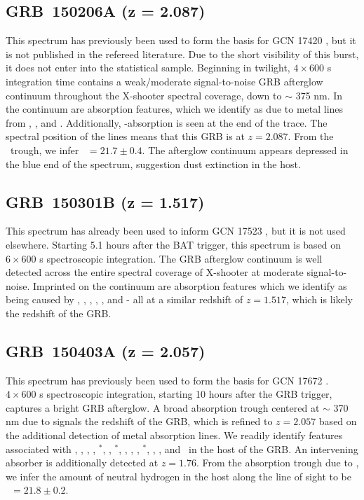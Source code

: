 \documentclass{aa}    %
\begin{document}
\subsection{GRB~150206A (z = 2.087)}\label{150206}

This spectrum has previously been used to form the basis for GCN 17420
\citep{GCN17420}, but it is not published in the refereed literature. Due to the
short visibility of this burst, it does not enter into the statistical sample.
Beginning in twilight, $4\times600$ s integration time contains a weak/moderate
signal-to-noise GRB afterglow continuum throughout the X-shooter spectral
coverage, down to $\sim$ 375 nm. In the continuum are absorption features,
which we identify as due to metal lines from \znii, \feii, and \mgii.
Additionally, \lya-absorption is seen at the end of the trace. The spectral
position of the lines means that this GRB is at $z = 2.087$. From the
\lya~trough, we infer \nh~$=21.7 \pm 0.4$. The afterglow continuum appears
depressed in the blue end of the spectrum, suggestion dust extinction in the
host.

\subsection{GRB~150301B (z = 1.517)}\label{150301}

This spectrum has already been used to inform GCN 17523 \citep{GCN17523}, but it
is not used elsewhere. Starting 5.1 hours after the BAT trigger, this spectrum
is based on $6 \times 600$ s spectroscopic integration. The GRB afterglow
continuum is well detected across the entire spectral coverage of X-shooter at
moderate signal-to-noise. Imprinted on the continuum are absorption features
which we identify as being caused by \SIii, \civ, \alii, \feii, \mgii, and \mgi
- all at a similar redshift of $z = 1.517$, which is likely the redshift of the
GRB.

\subsection{GRB~150403A (z = 2.057)}\label{150403}

This spectrum has previously been used to form the basis for GCN 17672
\citep{GCN17672}. $4 \times 600$ s spectroscopic integration, starting 10 hours
after the GRB trigger, captures a bright GRB afterglow. A broad absorption
trough centered at $\sim$ 370 nm due to \lya signals the redshift of the GRB,
which is refined to $z = 2.057$ based on the additional detection of metal
absorption lines. We readily identify features associated with \sii, \SIiv, \oi,
\SIii, \SIii$^*$, \cii, \cii$^*$, \civ, \alii, \feii, \feii$^*$, \mni, \mgii,
and \mgi~in the host of the GRB. An intervening \civ absorber is additionally
detected at $z=1.76$. From the absorption trough due to \lya, we infer the
amount of neutral hydrogen in the host along the line of sight to be \nh~$=21.8
\pm 0.2$.
\end{document}
